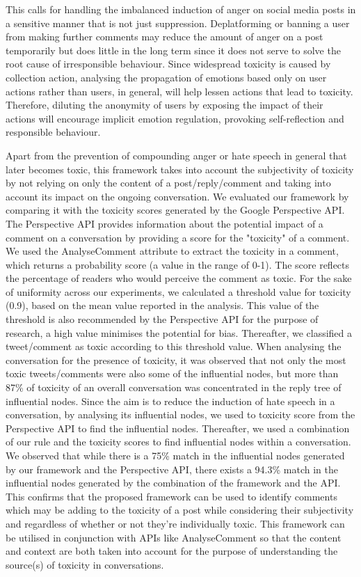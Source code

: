 \documentclass[acmtog]{acmart}
\begin{document}
This calls for handling the imbalanced induction of anger on social media posts in a sensitive manner that is not just suppression. Deplatforming or banning a user from making further comments may reduce the amount of anger on a post temporarily but does little in the long term since it does not serve to solve the root cause of irresponsible behaviour. Since widespread toxicity is caused by collection action, analysing the propagation of emotions based only on user actions rather than users, in general, will help lessen actions that lead to toxicity. Therefore, diluting the anonymity of users by exposing the impact of their actions will encourage implicit emotion regulation,  provoking self-reflection and responsible behaviour. 




Apart from the prevention of compounding anger or hate speech in general that later becomes toxic, this framework takes into account the subjectivity of toxicity by not relying on only the content of a post/reply/comment and taking into account its impact on the ongoing conversation. We evaluated our framework by comparing it with the toxicity scores generated by the Google Perspective API. The Perspective API provides information about the potential impact of a comment on a conversation by providing a score for the "toxicity" of a comment. We used the AnalyseComment attribute to extract the toxicity in a comment, which returns a probability score (a value in the range of 0-1). The score reflects the percentage of readers who would perceive the comment as toxic. For the sake of uniformity across our experiments, we calculated a threshold value for toxicity (0.9), based on the mean value reported in the analysis. This value of the threshold is also recommended by the Perspective API for the purpose of research, a high value minimises the potential for bias. Thereafter, we classified a tweet/comment as toxic according to this threshold value. When analysing the conversation for the presence of toxicity, it was observed that not only the most toxic tweets/comments were also some of the influential nodes, but more than 87\% of toxicity of an overall conversation was concentrated in the reply tree of influential nodes. Since the aim is to reduce the induction of hate speech in a conversation, by analysing its influential nodes, we used to toxicity score from the Perspective API to find the influential nodes. Thereafter, we used a combination of our rule and the toxicity scores to find influential nodes within a conversation. We observed that while there is a 75\% match in the influential nodes generated by our framework and the Perspective API, there exists a 94.3\% match in the influential nodes generated by the combination of the framework and the API. This confirms that the proposed framework can be used to identify comments which may be adding to the toxicity of a post while considering their subjectivity and regardless of whether or not they're individually toxic. This framework can be utilised in conjunction with APIs like AnalyseComment so that the content and context are both taken into account for the purpose of understanding the source(s) of toxicity in conversations.
\end{document}
